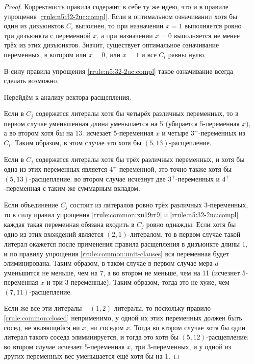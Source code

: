 \begin{proof}
 Корректность правила содержит в себе ту же идею, что и в правиле упрощения \ref{rrule:n5:32-2uc:compl}. Если в оптимальном означивании хотя бы один из дизъюнктов $C_i$ выполнен, то при назначении $x = 1$ выполняется ровно три дизъюнкта с переменной $x$, а при назначении $x = 0$ выполняется не менее трёх из этих дизъюнктов. Значит, существует оптимальное означивание переменных, в котором или $x = 0$, или $x = 1$ и все $C_i$ равны нулю.

 В силу правила упрощения \ref{rrule:n5:32-2uc:compl} такое означивание всегда сделать возможно.

 Перейдём к анализу вектора расщепления.

 Если в $C_j$ содержатся литералы хотя бы четырёх различных переменных, то в первом случае уменьшенная длина уменьшается на 5 (убирается 5-переменная $x$), а во втором хотя бы на 13: исчезает 5-переменная $x$ и четыре $3^+$-переменных из $C_i$. Таким образом, в этом случае это хотя бы $(5,13)$-расщепление.

  Если в $C_j$ содержатся литералы хотя бы трёх различных переменных, и хотя бы одна из этих переменных является $4^+$-переменной, это точно также хотя бы $(5,13)$-расщепление: во втором случае исчезнут две $3^+$-переменных и $4^+$-переменная с таким же суммарным вкладом.

  Если объединение $C_j$ состоит из литералов ровно трёх различных 3-переменных, то в силу правил упрощения \ref{rrule:common:xu19rr9} и \ref{rrule:n5:32-2uc:compl} каждая такая переменная обязана входить в $C_j$ ровно однажды. Если хотя бы одно из этих вхождений является $(2,1)$-литералом, то в первом случае такой литерал окажется после применения правила расщепления в дизъюнкте длины 1, и по правилу упрощения \ref{rrule:common:unit-clauses} вся переменная будет элиминирована. Таким образом, в таком случае в первом случае мера $d$ уменьшится не меньше, чем на 7, а во втором не меньше, чем на 11 (исчезнет 5-переменная $x$ и три 3-переменные). Таким образом, тогда это не хуже, чем $(7,11)$-расщепление.

  Если же все эти литералы -- $(1,2)$-литералы, то поскольку правило \ref{rrule:common:closed} неприменимо, у одной их этих переменных должен быть сосед, не являющийся ни $x$, ни соседом $x$. Тогда во втором случае хотя бы один литерал такого соседа элиминируется, и тогда это хотя бы $(5,12)$-расщепление: во втором случае исчезает 5-переменная $x$, три 3-переменных, и у одной из других переменных вес уменьшается ещё хотя бы на 1.


\end{proof}
